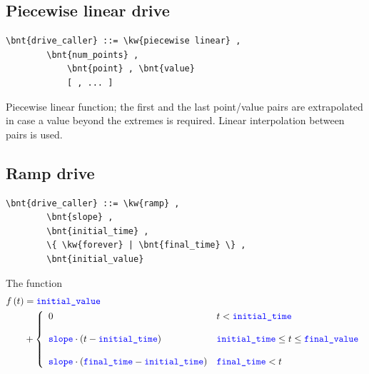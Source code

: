 \subsection{Piecewise linear drive}
\begin{Verbatim}[commandchars=\\\{\}]
    \bnt{drive_caller} ::= \kw{piecewise linear} ,
        \bnt{num_points} ,
            \bnt{point} , \bnt{value} 
            [ , ... ]
\end{Verbatim}
Piecewise linear function; the first and the last point/value pairs are
extrapolated in case a value beyond the extremes is required.
Linear interpolation between pairs is used.

\subsection{Ramp drive}
\begin{Verbatim}[commandchars=\\\{\}]
    \bnt{drive_caller} ::= \kw{ramp} ,
        \bnt{slope} , 
        \bnt{initial_time} ,
        \{ \kw{forever} | \bnt{final_time} \} ,
        \bnt{initial_value}
\end{Verbatim}
The function
\begin{align}
	f\plbr{t} &= \nt{initial\_value} \nonumber \\
	&+ \lcubr{\matr{ll}{
		0
			& t < \nt{initial\_time} \\
		\\
		\nt{slope} \cdot \plbr{t - \nt{initial\_time}}
			& \nt{initial\_time} \le t \le \nt{final\_value} \\
		\\
		\nt{slope} \cdot \plbr{\nt{final\_time} - \nt{initial\_time}}
			& \nt{final\_time} < t
	}}
\end{align}

